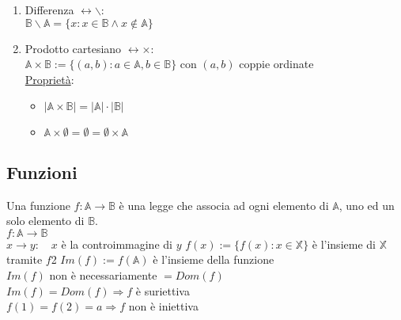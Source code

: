 \documentclass{article}
\begin{document}
\begin{enumerate}
\begin{itemize}
		  \end{itemize}
	\item Differenza $\leftrightarrow\backslash$:\\
		  $\mathbb{B}\backslash\mathbb{A}=\{x:x\in\mathbb{B}\wedge x\not\in\mathbb{A}\}$
	\item Prodotto cartesiano $\leftrightarrow\times$:\\
		  $\mathbb{A}\times\mathbb{B}:=\{(a,b):a\in\mathbb{A},b\in\mathbb{B}\}$ con $(a,b)$ coppie ordinate\\
		  \underline{Proprietà}:
		  \begin{itemize}
			  \item $|\mathbb{A}\times\mathbb{B}|=|\mathbb{A}|\cdot|\mathbb{B}|$
			  \item $\mathbb{A}\times\emptyset=\emptyset=\emptyset\times\mathbb{A}$
		  \end{itemize}
\end{enumerate}
\subsection*{Funzioni}
{Una funzione $f:\mathbb{A}\rightarrow\mathbb{B}$ è una legge che associa ad ogni elemento di $\mathbb{A}$, uno ed un solo elemento di $\mathbb{B}$.\\
$f:\mathbb{A}\rightarrow\mathbb{B}$\\
\hspace*{1.6em}$x\rightarrow y:\quad x$ è la controimmagine di $y$}
	{$f(x):=\{f(x):x\in\mathbb{X}\}$ è l'insieme di $\mathbb{X}$ tramite $f$2
	$Im(f):=f(\mathbb{A})$ è l'insieme della funzione\\
	$Im(f)$ non è necessariamente $=Dom(f)$\\
	$Im(f)=Dom(f)\Rightarrow f$ è suriettiva\\
	$f(1)=f(2)=a\Rightarrow f$ non è iniettiva}
\end{document}
